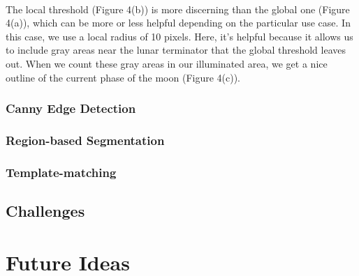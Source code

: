 \documentclass[]{article}
\begin{document}
\\
The local threshold (Figure 4(b)) is more discerning than the global one (Figure 4(a)), which can be more or less helpful depending on the particular use case. In this case, we use a local radius of 10 pixels. Here, it's helpful because it allows us to include gray areas near the lunar terminator that the global threshold leaves out. When we count these gray areas in our illuminated area, we get a nice outline of the current phase of the moon (Figure 4(c)).
\subsubsection*{Canny Edge Detection}
\subsubsection*{Region-based Segmentation}
\subsubsection*{Template-matching}
\subsection*{Challenges}
\section*{Future Ideas}
\end{document}

